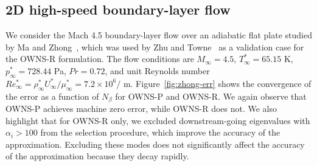 \subsection{2D high-speed boundary-layer flow}

We consider the Mach 4.5 boundary-layer flow over an adiabatic flat plate studied by Ma and Zhong~\cite{Ma_2003_DNS_1}, which was used by Zhu and Towne~\cite{Zhu_2021_OWNS-R} as a validation case for the OWNS-R formulation. The flow conditions are $M_\infty = 4.5$, $T_\infty^*=65.15$ K, $p_\infty^*=728.44$ Pa, $Pr=0.72$, and unit Reynolds number $Re_\infty^* = \rho_\infty^* U_\infty^* / \mu_\infty^*=7.2\times10^6 / $ m. Figure~\ref{fig:zhong-err} shows the convergence of the error as a function of $N_\beta$ for OWNS-P and OWNS-R. We again observe that OWNS-P achieves machine zero error, while OWNS-R does not. We also highlight that for OWNS-R only, we excluded downstream-going eigenvalues with $\alpha_i>100$ from the selection procedure, which improve the accuracy of the approximation. Excluding these modes does not significantly affect the accuracy of the approximation because they decay rapidly.


